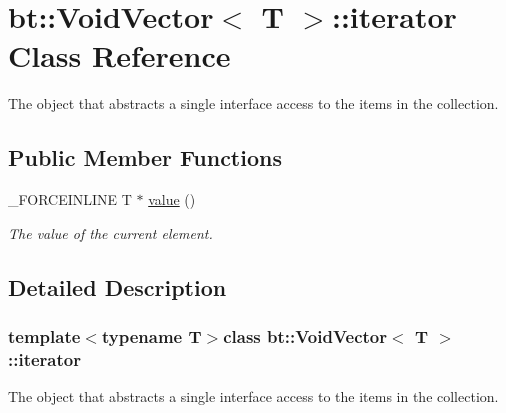 \hypertarget{classbt_1_1_void_vector_1_1iterator}{\section{bt\-:\-:Void\-Vector$<$ T $>$\-:\-:iterator Class Reference}
\label{classbt_1_1_void_vector_1_1iterator}
}


The object that abstracts a single interface access to the items in the collection.  


\subsection*{Public Member Functions}
\begin{DoxyCompactItemize}
\item 
\hypertarget{classbt_1_1_void_vector_1_1iterator_a3ed829d33f6d6edcc26bac88e6327ff0}{\-\_\-\-F\-O\-R\-C\-E\-I\-N\-L\-I\-N\-E T $\ast$ \hyperlink{classbt_1_1_void_vector_1_1iterator_a3ed829d33f6d6edcc26bac88e6327ff0}{value} ()}\label{classbt_1_1_void_vector_1_1iterator_a3ed829d33f6d6edcc26bac88e6327ff0}

\begin{DoxyCompactList}\small\item\em The value of the current element. \end{DoxyCompactList}\end{DoxyCompactItemize}


\subsection{Detailed Description}
\subsubsection*{template$<$typename T$>$class bt\-::\-Void\-Vector$<$ T $>$\-::iterator}

The object that abstracts a single interface access to the items in the collection. 